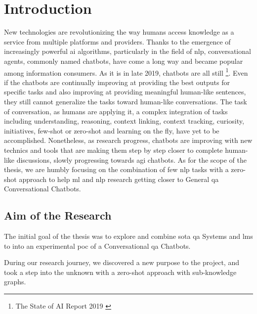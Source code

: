 \chapter{Introduction}
\label{chap:introduction}

New technologies are revolutionizing the way humans access knowledge as a service from multiple platforms and providers. Thanks to the emergence of increasingly powerful \gls{ai} algorithms, particularly in the field of \gls{nlp}, conversational agents, commonly named chatbots, have come a long way and became popular among information consumers. As it is in late 2019, chatbots are all still \footnote{The State of AI Report 2019 \autocite{studies:state_of_ai_2019}}. Even if the chatbots are continually improving at providing the best outputs for specific tasks and also improving at providing meaningful human-like sentences, they still cannot generalize the tasks toward human-like conversations. The task of conversation, as humans are applying it, a complex integration of tasks including understanding, reasoning, context linking, context tracking, curiosity, initiatives, \gls{few-shot} or \gls{zero-shot} and learning on the fly, have yet to be accomplished. Nonetheless, as research progress, chatbots are improving with new technics and tools that are making them step by step closer to complete human-like discussions, slowly progressing towards \gls{agi} chatbots. As for the scope of the thesis, we are humbly focusing on the combination of few \gls{nlp} tasks with a \gls{zero-shot} approach to help \gls{ml} and \gls{nlp} research getting closer to General \gls{qa} Conversational Chatbots. 

\section{Aim of the Research}
The initial goal of the thesis was to explore and combine \gls{sota} \gls{qa} Systems and \glspl{lm} to into an experimental \gls{poc} of a Conversational \gls{qa} Chatbots.

During our research journey, we discovered a new purpose to the project, and took a step into the unknown with a \gls{zero-shot} approach with sub-knowledge graphs.

